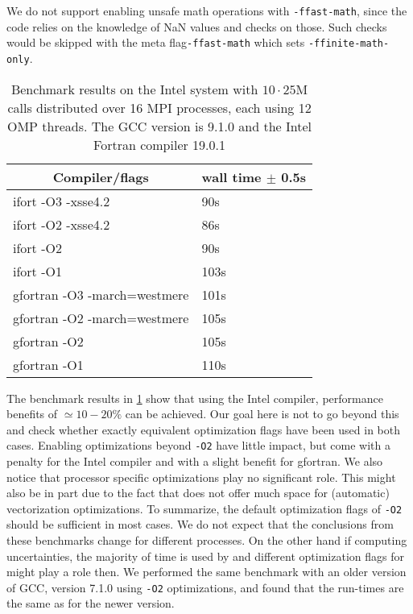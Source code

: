 We do not support enabling unsafe math operations with \texttt{-ffast-math}, since the code 
relies on the knowledge of NaN values and checks on those. Such checks would be skipped with the meta 
flag\texttt{-ffast-math} which sets \texttt{-ffinite-math-only}.


\begin{table}[]
	\centering
	\caption{Benchmark results on the Intel system with $10\cdot25$M calls distributed over 16 MPI processes, each 
	using 12 
	OMP 
	threads. The GCC version is 9.1.0 and the Intel Fortran compiler 19.0.1}
	\vspace{1em}
	\begin{tabular}{@{}ll@{}}
		\toprule
		\multicolumn{1}{c}{\textbf{Compiler/flags}} & \multicolumn{1}{c}{\textbf{wall time $\pm$ 0.5s}} \\ \midrule
		ifort -O3 -xsse4.2                          & 90s                                           \\
		ifort -O2 -xsse4.2                          & 86s                                           \\
		ifort -O2									& 90s											\\
		ifort -O1									& 103s 											\\
		gfortran -O3 -march=westmere                & 101s                                          \\ 
		gfortran -O2 -march=westmere		        & 105s											\\
		gfortran -O2								& 105s											\\
		gfortran -O1								& 110s											\\
		\bottomrule
	\end{tabular}
	\label{tab:benchintel}
\end{table}

The benchmark results in \cref{tab:benchintel} show that using the Intel compiler, performance benefits of $\simeq 
10-20\%$ can be achieved. Our goal here is not to go beyond this and check
whether exactly equivalent optimization flags have been used in both cases. Enabling optimizations beyond \texttt{-O2} 
have little impact, but come with a penalty for the Intel compiler and with a slight benefit for gfortran. We also
notice that processor specific optimizations play no significant role. This might also be in part due to the fact
that \MCFM{} does not offer much space for (automatic) vectorization optimizations. To summarize, the default 
optimization flags of 
\texttt{-O2} should be sufficient in most cases. We do not expect that the conclusions from these benchmarks
change for different processes. On the other hand if computing \PDF{} uncertainties, the majority of time
is used by \LHAPDF{} and different optimization flags for \LHAPDF{} might play a role then.
We performed the same benchmark with an older version of GCC, version 7.1.0 using \texttt{-O2} optimizations, and found 
that the run-times are the same as for the newer version.

